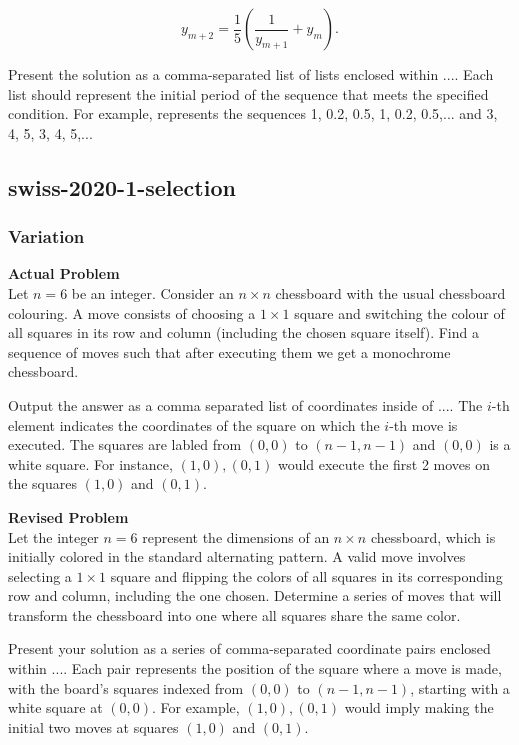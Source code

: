 $$y_{m+2} = \frac{1}{5} \left(\frac{1}{y_{m+1}} + y_m\right).$$

Present the solution as a comma-separated list of lists enclosed within $\boxed{...}$. Each list should represent the initial period of the sequence that meets the specified condition. For example,  represents the sequences 1, 0.2, 0.5, 1, 0.2, 0.5,... and 3, 4, 5, 3, 4, 5,...

\subsection{swiss-2020-1-selection}
\subsubsection{Variation}
\textbf{Actual Problem}\\
Let $n = 6$ be an integer. Consider an $n \times n$ chessboard with the usual chessboard colouring. A move consists of choosing a $1 \times 1$ square and switching the colour of all squares in its row and column (including the chosen square itself). Find a sequence of moves such that after executing them we get a monochrome chessboard.

Output the answer as a comma separated list of coordinates inside of $\boxed{...}$. The $i$-th element indicates the coordinates of the square on which the $i$-th move is executed. The squares are labled from $(0,0)$ to $(n-1,n-1)$ and $(0,0)$ is a white square. For instance, $\boxed{(1,0),(0,1)}$ would execute the first 2 moves on the squares $(1,0)$ and $(0,1)$.

\textbf{Revised Problem}\\
Let the integer $n = 6$ represent the dimensions of an $n \times n$ chessboard, which is initially colored in the standard alternating pattern. A valid move involves selecting a $1 \times 1$ square and flipping the colors of all squares in its corresponding row and column, including the one chosen. Determine a series of moves that will transform the chessboard into one where all squares share the same color.

Present your solution as a series of comma-separated coordinate pairs enclosed within $\boxed{...}$. Each pair represents the position of the square where a move is made, with the board's squares indexed from $(0,0)$ to $(n-1,n-1)$, starting with a white square at $(0,0)$. For example, $\boxed{(1,0),(0,1)}$ would imply making the initial two moves at squares $(1,0)$ and $(0,1)$.

